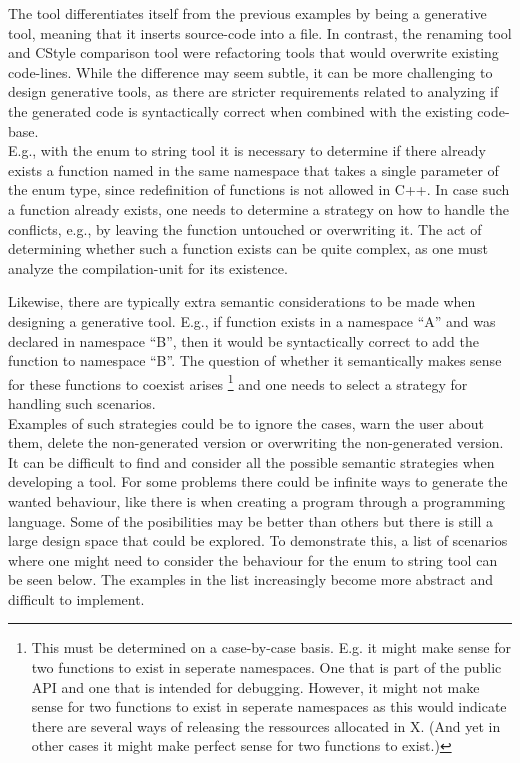 The tool differentiates itself from the previous examples by being a generative tool, meaning that it inserts source-code into a file.
In contrast, the renaming tool and CStyle comparison tool were refactoring tools that would overwrite existing code-lines.
While the difference may seem subtle, it can be more challenging to design generative tools, as there are stricter requirements related to analyzing if the generated code is syntactically correct when combined with the existing code-base.\\
E.g., with the enum to string tool it is necessary to determine if there already exists a function named  in the same namespace that takes a single parameter of the enum type, since redefinition of functions is not allowed in C++.
In case such a function already exists, one needs to determine a strategy on how to handle the conflicts, e.g., by leaving the function untouched or overwriting it.
The act of determining whether such a function exists can be quite complex, as one must analyze the compilation-unit for its existence.

Likewise, there are typically extra semantic considerations to be made when designing a generative tool. E.g., if  function exists in a namespace ``A'' and  was declared in namespace ``B'', then it would be syntactically correct to add the  function to namespace ``B''. The question of whether it semantically makes sense for these functions to coexist arises
\footnote{This must be determined on a case-by-case basis. E.g. it might make sense for two  functions to exist in seperate namespaces. One that is part of the public API and one that is intended for debugging. However, it might not make sense for two  functions to exist in seperate namespaces as this would indicate there are several ways of releasing the ressources allocated in X. (And yet in other cases it might make perfect sense for two  functions to exist.)}
and one needs to select a strategy for handling such scenarios.\\
Examples of such strategies could be to ignore the cases, warn the user about them, delete the non-generated version or overwriting the non-generated version.\\
It can be difficult to find and consider all the possible semantic strategies when developing a tool. For some problems there could be infinite ways to generate the wanted behaviour, like there is when creating a program through a programming language. Some of the posibilities may be better than others but there is still a large design space that could be explored.
To demonstrate this, a list of scenarios where one might need to consider the behaviour for the enum to string tool can be seen below. The examples in the list increasingly become more abstract and difficult to implement.

